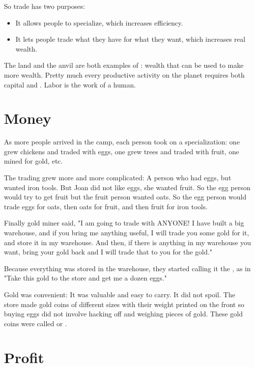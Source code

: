 So trade has two purposes:
\begin{itemize}
\item It allows people to specialize, which increases efficiency.
\item It lets people trade what they have for what they want, which increases real wealth.
\end{itemize}

The land and the anvil are both examples of : wealth that can be used to make more wealth. Pretty much every productive activity on the planet requires both capital and .  Labor is the work of a human.  

\section{Money}

As more people arrived in the camp, each person took on a specialization: one grew chickens and traded with eggs, one grew trees and traded with fruit, one mined for gold, etc.

The trading grew more and more complicated: A person who had eggs, but wanted iron tools.  But Joan did not like eggs, she wanted fruit.  So the egg person would try to get fruit but the fruit person wanted oats.  So the egg person would trade eggs for oats, then oats for fruit, and then fruit for iron tools.

Finally gold miner said, "I am going to trade with ANYONE!  I have built a big warehouse, and if you bring me anything useful, I will trade you some gold for it, and store it in my warehouse. And then, if there is anything in my warehouse you want, bring your gold back and I will trade that to you for the gold."

Because everything was stored in the warehouse, they started calling it the , as in "Take this gold to the store and get me a dozen eggs."

Gold was convenient: It was valuable and easy to carry. It did not spoil. The store made gold coins of different sizes with their weight printed on the front so buying eggs did not involve hacking off and weighing pieces of gold. These gold coins were called  or .

\section{Profit}

